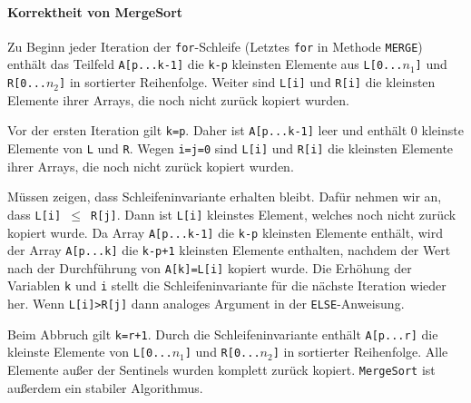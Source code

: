 \documentclass[
    ngerman,
    color=3b,
    dark_mode,
    load_common, %
    summary,
    boxarc,
]{rubos-tuda-template}
\begin{document}
\paragraph{Korrektheit von MergeSort}
\begin{description}[leftmargin=3.2cm,itemsep=1em]
    \item [Schleifeninvariante]
          Zu Beginn jeder Iteration der \texttt{for}-Schleife (Letztes \texttt{for} in Methode \texttt{MERGE}) enthält
          das Teilfeld \texttt{A[p...k-1]} die \texttt{k-p} kleinsten Elemente aus \texttt{L[0...$n_1$]} und \texttt{R[0...$n_2$]}
          in sortierter Reihenfolge. Weiter sind \texttt{L[i]} und \texttt{R[i]} die kleinsten Elemente ihrer Arrays, die noch nicht
          zurück kopiert wurden.
    \item [Initialisierung]
          Vor der ersten Iteration gilt \texttt{k=p}. Daher ist \texttt{A[p...k-1]} leer und enthält 0 kleinste Elemente von
          \texttt{L} und \texttt{R}. Wegen \texttt{i=j=0} sind \texttt{L[i]} und \texttt{R[i]} die kleinsten Elemente ihrer
          Arrays, die noch nicht zurück kopiert wurden.
    \item [Fortsetzung]
          Müssen zeigen, dass Schleifeninvariante erhalten bleibt. Dafür nehmen wir an, dass \texttt{L[i] $\leq$ R[j]}. Dann ist
          \texttt{L[i]} kleinstes Element, welches noch nicht zurück kopiert wurde. Da Array \texttt{A[p...k-1]} die \texttt{k-p}
          kleinsten Elemente enthält, wird der Array \texttt{A[p...k]} die \texttt{k-p+1} kleinsten Elemente enthalten, nachdem
          der Wert nach der Durchführung von \texttt{A[k]=L[i]} kopiert wurde. Die Erhöhung der Variablen \texttt{k} und \texttt{i}
          stellt die Schleifeninvariante für die nächste Iteration wieder her. Wenn \texttt{L[i]>R[j]} dann analoges Argument
          in der \texttt{ELSE}-Anweisung.
    \item [Terminierung]
          Beim Abbruch gilt \texttt{k=r+1}. Durch die Schleifeninvariante enthält \texttt{A[p...r]} die kleinste Elemente von
          \texttt{L[0...$n_1$]} und \texttt{R[0...$n_2$]} in sortierter Reihenfolge. Alle Elemente au\ss{}er der Sentinels wurden
          komplett zurück kopiert. \texttt{MergeSort} ist au\ss{}erdem ein stabiler Algorithmus.
\end{description}
\end{document}
